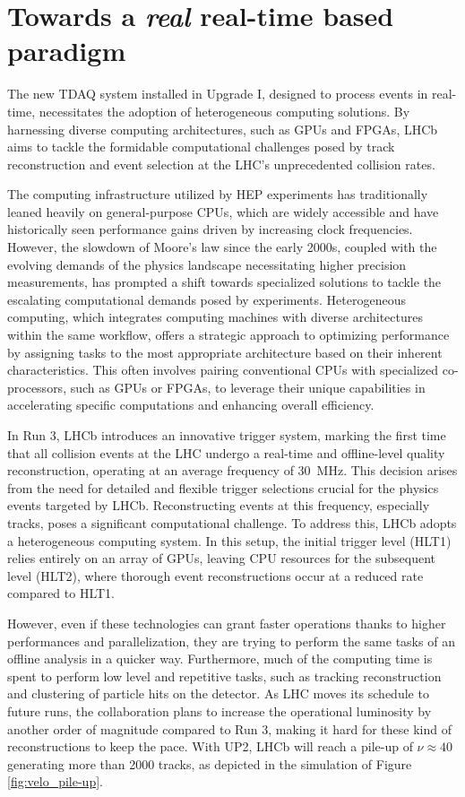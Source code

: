 \section{Towards a \textit{real} real-time based paradigm}
The new TDAQ system installed in Upgrade I\cite{lhcbcollaboration2023lhcb}, designed to process events in real-time, necessitates the adoption of heterogeneous computing solutions. By harnessing diverse computing architectures, such as GPUs and FPGAs, LHCb aims to tackle the formidable computational challenges posed by track reconstruction and event selection at the LHC's unprecedented collision rates.

The computing infrastructure utilized by HEP experiments has traditionally leaned heavily on general-purpose CPUs, which are widely accessible and have historically seen performance gains driven by increasing clock frequencies. However, the slowdown of Moore's law since the early 2000s\cite{Tuomi_2002}, coupled with the evolving demands of the physics landscape necessitating higher precision measurements, has prompted a shift towards specialized solutions to tackle the escalating computational demands posed by experiments. Heterogeneous computing, which integrates computing machines with diverse architectures within the same workflow, offers a strategic approach to optimizing performance by assigning tasks to the most appropriate architecture based on their inherent characteristics. This often involves pairing conventional CPUs with specialized co-processors, such as GPUs or FPGAs, to leverage their unique capabilities in accelerating specific computations and enhancing overall efficiency.

In Run 3, LHCb introduces an innovative trigger system, marking the first time that all collision events at the LHC undergo a real-time and offline-level quality reconstruction, operating at an average frequency of \SI{30}{\mega\hertz}. This decision arises from the need for detailed and flexible trigger selections crucial for the physics events targeted by LHCb. Reconstructing events at this frequency, especially tracks, poses a significant computational challenge. To address this, LHCb adopts a heterogeneous computing system. In this setup, the initial trigger level (HLT1) relies entirely on an array of GPUs, leaving CPU resources for the subsequent level (HLT2), where thorough event reconstructions occur at a reduced rate compared to HLT1. 

However, even if these technologies can grant faster operations thanks to higher performances and parallelization, they are trying to perform the same tasks of an offline analysis in a quicker way. Furthermore, much of the computing time is spent to perform low level and repetitive tasks, such as tracking reconstruction and clustering of particle hits on the detector. As LHC moves its schedule to future runs, the collaboration plans to increase the operational luminosity by another order of magnitude compared to Run 3, making it hard for these kind of reconstructions to keep the pace. With UP2, LHCb will reach a pile-up of $\nu\approx 40$ generating more than 2000 tracks, as depicted in the simulation of Figure \ref{fig:velo_pile-up}. 

